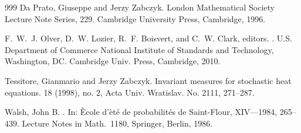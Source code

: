 \documentclass{article}
\numberwithin{equation}{section}
\begin{document}
\begin{small}
\begin{thebibliography}{999}
Da Prato, Giuseppe and Jerzy Zabczyk.
\newblock London Mathematical Society Lecture Note Series, 229. Cambridge University Press, Cambridge, 1996.

F.~W.~J. Olver, D.~W. Lozier, R.~F. Boisvert, and C.~W. Clark, editors.
.
\newblock U.S. Department of Commerce National Institute of Standards  and Technology, Washington, DC. Cambridge Univ. Press, Cambridge, 2010.

Tessitore, Gianmario and Jerzy Zabczyk.
\newblock Invariant measures for stochastic heat equations. 
 18 (1998), no. 2, Acta Univ. Wratislav. No. 2111, 271--287. 

 Walsh, John B.
.
\newblock In: \`Ecole d'\`et\'e de probabilit\'es de
Saint-Flour, XIV---1984, 265--439.
Lecture Notes in Math.\ 1180, Springer, Berlin, 1986.

\end{thebibliography}
\end{small}
\end{document}
